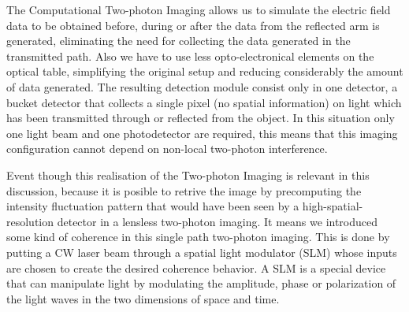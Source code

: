 The Computational Two-photon Imaging allows us to simulate the electric field data to be obtained before, during or after the data from the reflected arm is generated,
eliminating the need for collecting the data generated in the transmitted path. Also we have to use less opto-electronical elements on the optical table, simplifying 
the original setup and reducing considerably the amount of data generated. The resulting detection module consist only in one detector, a bucket detector that collects
 a single pixel (no spatial information) on light which has been transmitted through or reflected from the object.
In this situation only one light beam and one photodetector are required, this means that this imaging configuration cannot depend
on non-local two-photon interference.

Event though this realisation of the Two-photon Imaging is relevant in this discussion, 
because it is posible to retrive the image by precomputing the intensity fluctuation pattern that 
would have been seen by a high-spatial-resolution detector in a lensless two-photon imaging. 
It means we introduced some kind of coherence in this single path two-photon imaging. This is done by putting a CW
laser beam through a spatial light modulator (SLM) whose inputs are chosen to create the desired coherence behavior\cite{computational}.
A SLM is a special device that can manipulate light by modulating the amplitude, phase or polarization of the light waves in the two dimensions of space and time.



